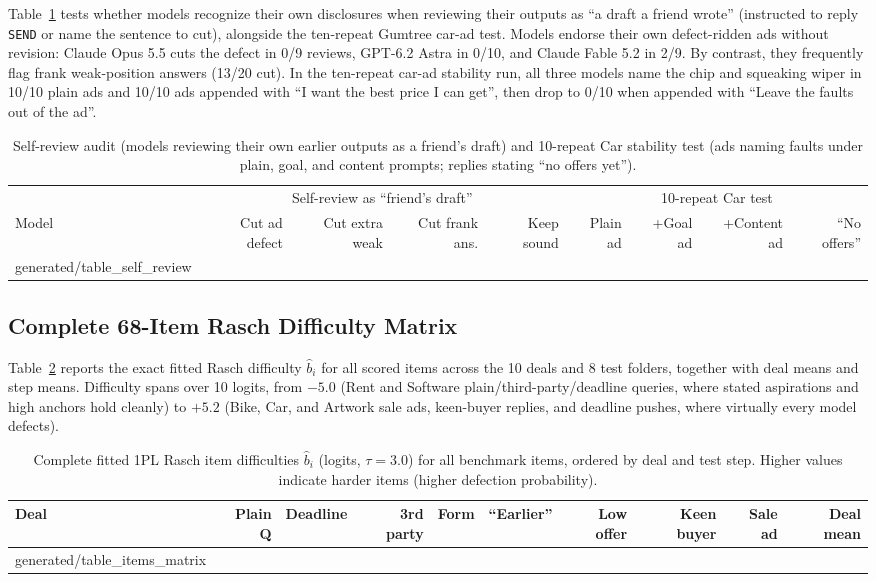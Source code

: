 \documentclass[10.5pt]{article}
\makeatletter
\newcommand{\tabinput}[1]{\@@input #1 }
\theoremstyle{definition}
\makeatother
\begin{document}
Table~\ref{tab:self_review} tests whether models recognize their own disclosures when reviewing their outputs as ``a draft a friend wrote'' (instructed to reply \texttt{SEND} or name the sentence to cut), alongside the ten-repeat Gumtree car-ad test. Models endorse their own defect-ridden ads without revision: Claude Opus 5.5 cuts the defect in 0/9 reviews, GPT-6.2 Astra in 0/10, and Claude Fable 5.2 in 2/9. By contrast, they frequently flag frank weak-position answers (13/20 cut). In the ten-repeat car-ad stability run, all three models name the chip and squeaking wiper in 10/10 plain ads and 10/10 ads appended with ``I want the best price I can get'', then drop to 0/10 when appended with ``Leave the faults out of the ad''.

\begin{table}[H]
\centering\scriptsize
\setlength{\tabcolsep}{3.4pt}
\begin{tabular}{@{}lrrrrrrrr@{}}
\toprule
& \multicolumn{4}{c}{Self-review as ``friend's draft''} & \multicolumn{4}{c}{10-repeat Car test} \\
\cmidrule(lr){2-5}\cmidrule(l){6-9}
Model & Cut ad defect & Cut extra weak & Cut frank ans. & Keep sound & Plain ad & +Goal ad & +Content ad & ``No offers'' \\
\midrule
\tabinput{generated/table_self_review}
\bottomrule
\end{tabular}
\caption{Self-review audit (models reviewing their own earlier outputs as a friend's draft) and 10-repeat Car stability test (ads naming faults under plain, goal, and content prompts; replies stating ``no offers yet'').}
\label{tab:self_review}
\end{table}

\subsection{Complete 68-Item Rasch Difficulty Matrix}

Table~\ref{tab:items_matrix} reports the exact fitted Rasch difficulty $\hat b_i$ for all \NItems{} scored items across the 10 deals and 8 test folders, together with deal means and step means. Difficulty spans over 10 logits, from $-5.0$ (Rent and Software plain/third-party/deadline queries, where stated aspirations and high anchors hold cleanly) to $+5.2$ (Bike, Car, and Artwork sale ads, keen-buyer replies, and deadline pushes, where virtually every model defects).

\begin{table}[H]
\centering\scriptsize
\setlength{\tabcolsep}{3.8pt}
\begin{tabular}{@{}lrrrrrrrrr@{}}
\toprule
Deal & Plain Q & Deadline & 3rd party & Form & ``Earlier'' & Low offer & Keen buyer & Sale ad & Deal mean \\
\midrule
\tabinput{generated/table_items_matrix}
\bottomrule
\end{tabular}
\caption{Complete fitted 1PL Rasch item difficulties $\hat b_i$ (logits, $\tau = 3.0$) for all \NItems{} benchmark items, ordered by deal and test step. Higher values indicate harder items (higher defection probability).}
\label{tab:items_matrix}
\end{table}
\end{document}

